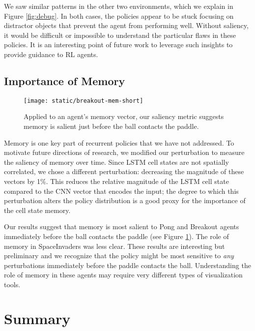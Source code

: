 \documentclass{article}
\begin{document}
We saw similar patterns in the other two environments, which we explain in Figure \ref{fig:debug}. In both cases, the policies appear to be stuck focusing on distractor objects that prevent the agent from performing well. Without saliency, it would be difficult or impossible to understand the particular flaws in these policies. It is an interesting point of future work to leverage such insights to provide guidance to RL agents.

\subsection{Importance of Memory}
\begin{figure}[h!]
\centering
\texttt{[image: static/breakout-mem-short]}
\caption{Applied to an agent's memory vector, our saliency metric suggests memory is salient just before the ball contacts the paddle.}
\label{fig:breakout-mem}
\end{figure}

Memory is one key part of recurrent policies that we have not addressed. To motivate future directions of research, we modified our perturbation to measure the saliency of memory over time. Since LSTM cell states are not spatially correlated, we chose a different perturbation: decreasing the magnitude of these vectors by 1\%. This reduces the relative magnitude of the LSTM cell state compared to the CNN vector that encodes the input; the degree to which this perturbation alters the policy distribution is a good proxy for the importance of the cell state memory.

Our results suggest that memory is most salient to Pong and Breakout agents immediately before the ball contacts the paddle (see Figure \ref{fig:breakout-mem}). The role of memory in SpaceInvaders was less clear. These results are interesting but preliminary and we recognize that the policy might be most sensitive to \textit{any} perturbations immediately before the paddle contacts the ball. Understanding the role of memory in these agents may require very different types of visualization tools.

\section{Summary}
\end{document}
